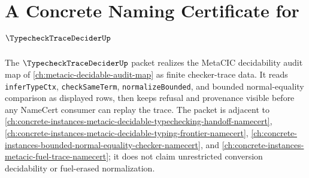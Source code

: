 \chapter{A Concrete Naming Certificate for $\TypecheckTraceDeciderUp$}
\label{ch:concrete-instances-typecheck-trace-decider-namecert}

The $\TypecheckTraceDeciderUp$ packet realizes the MetaCIC decidability audit map of \autoref{ch:metacic-decidable-audit-map} as finite checker-trace data. It reads \texttt{inferTypeCtx}, \texttt{checkSameTerm}, \texttt{normalizeBounded}, and bounded normal-equality comparison as displayed rows, then keeps refusal and provenance visible before any NameCert consumer can replay the trace. The packet is adjacent to \autoref{ch:concrete-instances-metacic-decidable-typechecking-handoff-namecert}, \autoref{ch:concrete-instances-metacic-decidable-typing-frontier-namecert}, \autoref{ch:concrete-instances-bounded-normal-equality-checker-namecert}, and \autoref{ch:concrete-instances-metacic-fuel-trace-namecert}; it does not claim unrestricted conversion decidability or fuel-erased normalization.

